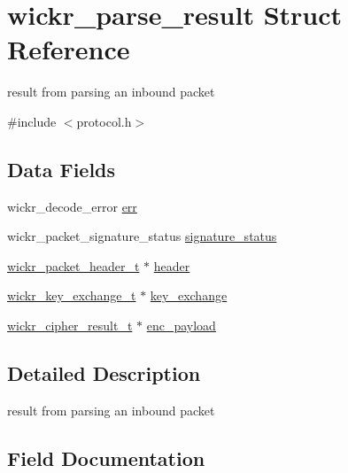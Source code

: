 \hypertarget{structwickr__parse__result}{}\section{wickr\+\_\+parse\+\_\+result Struct Reference}
\label{structwickr__parse__result}


result from parsing an inbound packet  




{\ttfamily \#include $<$protocol.\+h$>$}

\subsection*{Data Fields}
\begin{DoxyCompactItemize}
\item 
wickr\+\_\+decode\+\_\+error \hyperlink{structwickr__parse__result_a69a3ee332921b4fdbc0e07dbfa74a8ed}{err}
\item 
wickr\+\_\+packet\+\_\+signature\+\_\+status \hyperlink{structwickr__parse__result_a989166b5471898853f03b9e9c58f69c0}{signature\+\_\+status}
\item 
\hyperlink{structwickr__packet__header}{wickr\+\_\+packet\+\_\+header\+\_\+t} $\ast$ \hyperlink{structwickr__parse__result_acf549d7cbae0f227d5aa60c3c5bb12d3}{header}
\item 
\hyperlink{structwickr__key__exchange}{wickr\+\_\+key\+\_\+exchange\+\_\+t} $\ast$ \hyperlink{structwickr__parse__result_ab33e5d00121c229280bbee814ca7ef5a}{key\+\_\+exchange}
\item 
\hyperlink{structwickr__cipher__result}{wickr\+\_\+cipher\+\_\+result\+\_\+t} $\ast$ \hyperlink{structwickr__parse__result_a584d3b94e032f09188ee4006c067c180}{enc\+\_\+payload}
\end{DoxyCompactItemize}


\subsection{Detailed Description}
result from parsing an inbound packet 

\subsection{Field Documentation}
\mbox{\label{structwickr__parse__result_a584d3b94e032f09188ee4006c067c180}} 
